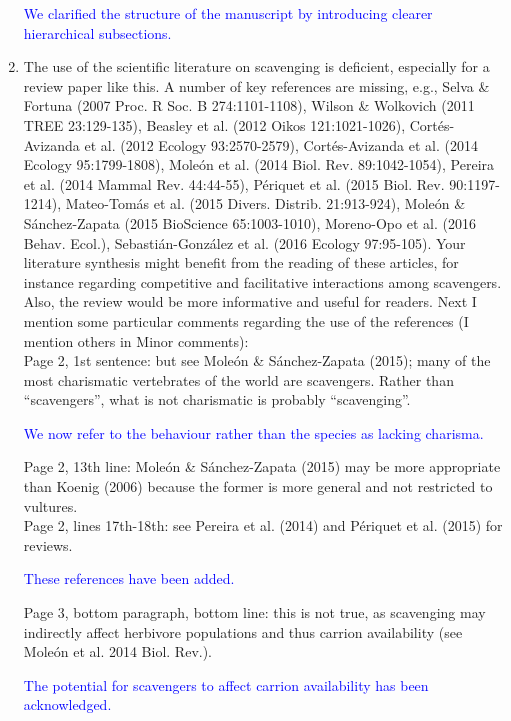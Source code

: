 \documentclass[12pt,letterpaper]{article}
\begin{document}
\begin{enumerate}
\textcolor{blue}{We clarified the structure of the manuscript by introducing clearer hierarchical subsections.}

\item{The use of the scientific literature on scavenging is deficient, especially for a review paper like this. A number of key references are missing, e.g., Selva \& Fortuna (2007 Proc. R Soc. B 274:1101-1108), Wilson \& Wolkovich (2011 TREE 23:129-135), Beasley et al. (2012 Oikos 121:1021-1026), Cort\'{e}s-Avizanda et al. (2012 Ecology 93:2570-2579), Cort\'{e}s-Avizanda et al. (2014 Ecology 95:1799-1808), Mole\'{o}n et al. (2014 Biol. Rev. 89:1042-1054), Pereira et al. (2014 Mammal Rev. 44:44-55), P\'{e}riquet et al. (2015 Biol. Rev. 90:1197-1214), Mateo-Tom\'{a}s et al. (2015 Divers. Distrib. 21:913-924), Mole\'{o}n \& S\'{a}nchez-Zapata (2015 BioScience 65:1003-1010), Moreno-Opo et al. (2016 Behav. Ecol.), Sebasti\'{a}n-Gonz\'{a}lez et al. (2016 Ecology 97:95-105). Your literature synthesis might benefit from the reading of these articles, for instance regarding competitive and facilitative interactions among scavengers. Also, the review would be more informative and useful for readers. Next I mention some particular comments regarding the use of the references (I mention others in Minor comments):}\\

Page 2, 1st sentence: but see Mole\'{o}n \& S\'{a}nchez-Zapata (2015); many of the most charismatic vertebrates of the world are scavengers. Rather than ``scavengers'', what is not charismatic is probably ``scavenging''.

\textcolor{blue}{We now refer to the behaviour rather than the species as lacking charisma.}

 Page 2, 13th line: Mole\'{o}n \& S\'{a}nchez-Zapata (2015) may be more appropriate than Koenig (2006) because the former is more general and not restricted to vultures.\\
 Page 2, lines 17th-18th: see Pereira et al. (2014) and P\'{e}riquet et al. (2015) for reviews.

\textcolor{blue}{These references have been added.}

 Page 3, bottom paragraph, bottom line: this is not true, as scavenging may indirectly affect herbivore populations and thus carrion availability (see Mole\'{o}n et al. 2014 Biol. Rev.).

\textcolor{blue}{The potential for scavengers to affect carrion availability has been acknowledged.}


\end{enumerate}
\end{document}
